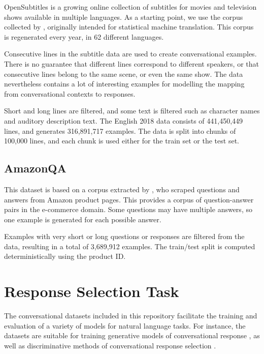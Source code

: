 \documentclass[11pt,a4paper,table]{article}
\begin{document}
OpenSubtitles is a growing online collection of subtitles for movies and television shows available in multiple languages.
As a starting point, we use the corpus collected by , originally intended for statistical machine translation. This corpus is regenerated every year, in 62 different languages.

Consecutive lines in the subtitle data are used to create conversational examples. There is no guarantee that different lines correspond to different speakers, or that consecutive lines belong to the same scene, or even the same show. The data nevertheless contains a lot of interesting examples for modelling the mapping from conversational contexts to responses.

Short and long lines are filtered, and some text is filtered such as character names and auditory description text.  The English 2018 data consists of 441,450,449 lines, and generates 316,891,717 examples. The data is split into chunks of 100,000 lines, and each chunk is used either for the train set or the test set.

\subsection{AmazonQA}

This dataset is based on a corpus extracted by , who scraped questions and answers from Amazon product pages. This provides a corpus of question-answer pairs in the e-commerce domain. Some questions may have multiple answers, so one example is generated for each possible answer.

Examples with very short or long questions or responses are filtered from the data, resulting in a total of 3,689,912 examples. The train/test split is computed deterministically using the product ID.

\section{Response Selection Task} \label{sec:methods}

The conversational datasets included in this repository facilitate the training and evaluation of a variety of models for natural language tasks. For instance, the datasets are suitable for training generative models of conversational response \cite{serban2016generative,Ritter:2011,VinyalsL15,SordoniGABJMNGD15,ShangLL15,Kannan:2016kdd}, as well as discriminative methods of conversational response selection \cite{Lowe2015TheUD, inaba2016neural, yu2016strategy,Henderson:2017arxiv}.
\end{document}
